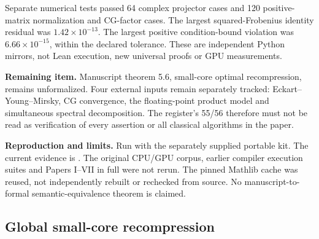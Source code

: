 Separate numerical tests passed 64 complex projector cases and 120 positive-matrix normalization and CG-factor cases. The largest squared-Frobenius identity residual was $1.42\times10^{-13}$. The largest positive condition-bound violation was $6.66\times10^{-15}$, within the declared tolerance. These are independent Python mirrors, not Lean execution, new universal proofs or GPU measurements.

\textbf{Remaining item.} Manuscript theorem 5.6, small-core optimal recompression, remains unformalized. Four external inputs remain separately tracked: Eckart--Young--Mirsky, CG convergence, the floating-point product model and simultaneous spectral decomposition. The register's 55/56 therefore must not be read as verification of every assertion or all classical algorithms in the paper.

\textbf{Reproduction and limits.} Run  with the separately supplied portable kit. The current evidence is . The original CPU/GPU corpus, earlier compiler execution suites and Papers I--VII in full were not rerun. The pinned Mathlib cache was reused, not independently rebuilt or rechecked from source. No manuscript-to-formal semantic-equivalence theorem is claimed.


\subsection{Global small-core recompression}\label{sec:history-6}


